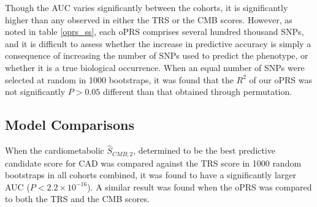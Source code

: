 Though the \ac{AUC} varies significantly between the cohorts, it is significantly higher than any observed in either the \ac{TRS} or the \ac{CMB} scores. However, as noted in table \ref{oprs_ss}, each \ac{oPRS} comprises several hundred thousand \acp{SNP}, and it is difficult to assess whether the increase in predictive accuracy is simply a consequence of increasing the number of \acp{SNP} used to predict the phenotype, or whether it is a true biological occurrence. When an equal number of \acp{SNP} were selected at random in 1000 bootstraps, it was found that the $R^2$ of our \ac{oPRS} was not significantly $P > 0.05$ different than that obtained through permutation.


\subsection{Model Comparisons}

When the cardiometabolic $\hat{S}_{CMB; 2}$, determined to be the best predictive candidate score for \ac{CAD} was compared against the \ac{TRS} score in 1000 random bootstraps in all cohorts combined, it was found to have a significantly larger \ac{AUC} ($P < 2.2 \times 10^{-16}$). A similar result was found when the \ac{oPRS} was compared to both the \ac{TRS} and the \ac{CMB} scores.